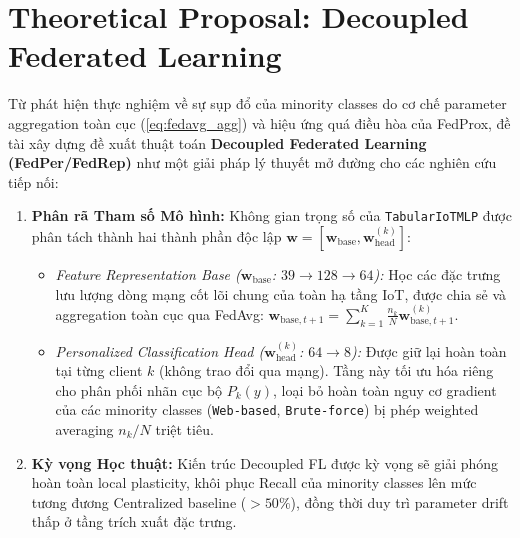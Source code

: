 \section{Theoretical Proposal: Decoupled Federated Learning}
\label{sec:concl_decoupled}
Từ phát hiện thực nghiệm về sự sụp đổ của minority classes do cơ chế parameter aggregation toàn cục (\ref{eq:fedavg_agg}) và hiệu ứng quá điều hòa của FedProx, đề tài xây dựng đề xuất thuật toán \textbf{Decoupled Federated Learning (FedPer/FedRep)} như một giải pháp lý thuyết mở đường cho các nghiên cứu tiếp nối:
\begin{enumerate}
    \item \textbf{Phân rã Tham số Mô hình:} Không gian trọng số của \texttt{TabularIoTMLP} được phân tách thành hai thành phần độc lập $\mathbf{w} = [\mathbf{w}_{\text{base}}, \mathbf{w}_{\text{head}}^{(k)}]$:
    \begin{itemize}
        \item \textit{Feature Representation Base ($\mathbf{w}_{\text{base}}$: $39 \to 128 \to 64$):} Học các đặc trưng lưu lượng dòng mạng cốt lõi chung của toàn hạ tầng IoT, được chia sẻ và aggregation toàn cục qua FedAvg: $\mathbf{w}_{\text{base}, t+1} = \sum_{k=1}^K \frac{n_k}{N} \mathbf{w}_{\text{base}, t+1}^{(k)}$.
        \item \textit{Personalized Classification Head ($\mathbf{w}_{\text{head}}^{(k)}$: $64 \to 8$):} Được giữ lại hoàn toàn tại từng client $k$ (không trao đổi qua mạng). Tầng này tối ưu hóa riêng cho phân phối nhãn cục bộ $P_k(y)$, loại bỏ hoàn toàn nguy cơ gradient của các minority classes (\texttt{Web-based}, \texttt{Brute-force}) bị phép weighted averaging $n_k/N$ triệt tiêu.
    \end{itemize}
    \item \textbf{Kỳ vọng Học thuật:} Kiến trúc Decoupled FL được kỳ vọng sẽ giải phóng hoàn toàn local plasticity, khôi phục Recall của minority classes lên mức tương đương Centralized baseline ($>50\%$), đồng thời duy trì parameter drift thấp ở tầng trích xuất đặc trưng.
\end{enumerate}

